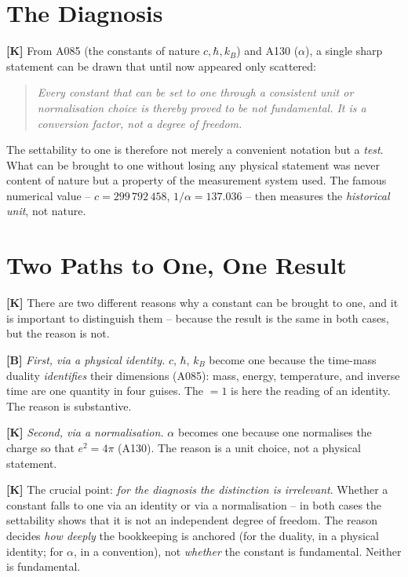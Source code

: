 \section{The Diagnosis}

\textbf{[K]} From A085 (the constants of nature $c, \hbar, k_B$) and A130
($\alpha$), a single sharp statement can be drawn that until now appeared only
scattered:
\begin{quote}
\emph{Every constant that can be set to one through a consistent unit or
normalisation choice is thereby proved to be \emph{not fundamental}. It is a
conversion factor, not a degree of freedom.}
\end{quote}

The settability to one is therefore not merely a convenient notation but a
\emph{test}. What can be brought to one without losing any physical statement was
never content of nature but a property of the measurement system used. The famous
numerical value -- $c = 299\,792\,458$, $1/\alpha = 137{.}036$ -- then measures
the \emph{historical unit}, not nature.

\section{Two Paths to One, One Result}

\textbf{[K]} There are two different reasons why a constant can be brought to one,
and it is important to distinguish them -- because the result is the same in both
cases, but the reason is not.

\textbf{[B]} \emph{First, via a physical identity.} $c$, $\hbar$, $k_B$ become
one because the time-mass duality \emph{identifies} their dimensions (A085): mass,
energy, temperature, and inverse time are one quantity in four guises. The $=1$ is
here the reading of an identity. The reason is substantive.

\textbf{[K]} \emph{Second, via a normalisation.} $\alpha$ becomes one because one
normalises the charge so that $e^2 = 4\pi$ (A130). The reason is a unit choice,
not a physical statement.

\textbf{[K]} The crucial point: \emph{for the diagnosis the distinction is
irrelevant}. Whether a constant falls to one via an identity or via a
normalisation -- in both cases the settability shows that it is not an independent
degree of freedom. The reason decides \emph{how deeply} the bookkeeping is anchored
(for the duality, in a physical identity; for $\alpha$, in a convention), not
\emph{whether} the constant is fundamental. Neither is fundamental.

